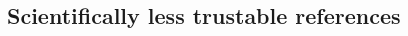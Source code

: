 \begin{thebibliography}{10}

\subsection*{Scientifically less trustable references}


\end{thebibliography}
